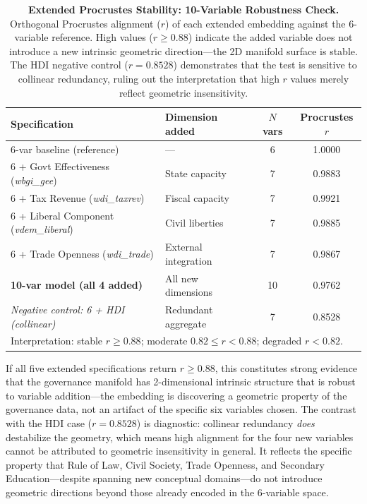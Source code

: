 \documentclass[12pt]{article}
\begin{document}
\begin{table}[htbp]
    \centering
    \caption{\textbf{Extended Procrustes Stability: 10-Variable Robustness Check.} Orthogonal Procrustes alignment ($r$) of each extended embedding against the 6-variable reference. High values ($r \geq 0.88$) indicate the added variable does not introduce a new intrinsic geometric direction---the 2D manifold surface is stable. The HDI negative control ($r = 0.8528$) demonstrates that the test is sensitive to collinear redundancy, ruling out the interpretation that high $r$ values merely reflect geometric insensitivity.}
    \label{tab:extended_procrustes}
    \begin{tabular}{llcc}
        \toprule
        Specification                                  & Dimension added      & $N$ vars & Procrustes $r$                           \\
        \midrule
        6-var baseline (reference)                     & —                    & 6        & 1.0000                                   \\
        \midrule
        6 + Govt Effectiveness (\textit{wbgi\_gee})    & State capacity       & 7        & 0.9883                                   \\
        6 + Tax Revenue (\textit{wdi\_taxrev})         & Fiscal capacity      & 7        & 0.9921                                   \\
        6 + Liberal Component (\textit{vdem\_liberal}) & Civil liberties      & 7        & 0.9885                                   \\
        6 + Trade Openness (\textit{wdi\_trade})       & External integration & 7        & 0.9867                                   \\
        \midrule
        \textbf{10-var model (all 4 added)}            & All new dimensions   & 10       & 0.9762                                   \\
        \midrule
        \textit{Negative control: 6 + HDI (collinear)} & Redundant aggregate  & 7        & 0.8528                                   \\
        \bottomrule
        \multicolumn{4}{l}{\footnotesize Interpretation: stable $r \geq 0.88$; moderate $0.82 \leq r < 0.88$; degraded $r < 0.82$.} \\
    \end{tabular}
\end{table}

If all five extended specifications return $r \geq 0.88$, this constitutes strong evidence that the governance manifold has 2-dimensional intrinsic structure that is robust to variable addition---the embedding is discovering a geometric property of the governance data, not an artifact of the specific six variables chosen. The contrast with the HDI case ($r = 0.8528$) is diagnostic: collinear redundancy \textit{does} destabilize the geometry, which means high alignment for the four new variables cannot be attributed to geometric insensitivity in general. It reflects the specific property that Rule of Law, Civil Society, Trade Openness, and Secondary Education---despite spanning new conceptual domains---do not introduce geometric directions beyond those already encoded in the 6-variable space.
\end{document}
